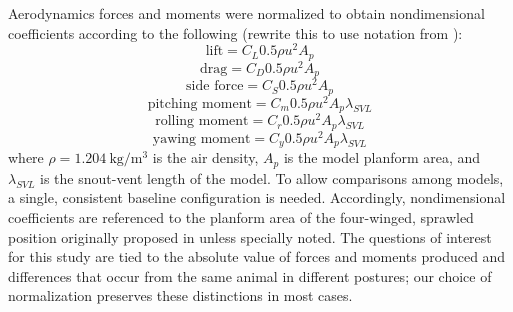 Aerodynamics forces and moments were  normalized to obtain nondimensional coefficients according to the following (rewrite this to use notation from \citep{McCormick:1995}): 
\begin{equation}
\mbox{lift} = C_L 0.5 \rho u^2 A_p
\end{equation}
\begin{equation}
\mbox{drag} = C_D 0.5 \rho u^2 A_p
\end{equation}
\begin{equation}
\mbox{side force} = C_S 0.5 \rho u^2 A_p
\end{equation}
\begin{equation}
\mbox{pitching moment} = C_m 0.5 \rho u^2 A_p \lambda_{SVL}
\end{equation}
\begin{equation}
\mbox{rolling moment} = C_r 0.5 \rho u^2 A_p \lambda_{SVL}
\end{equation}
\begin{equation}
\mbox{yawing moment} = C_y 0.5 \rho u^2 A_p \lambda_{SVL}
\end{equation}
where $\rho=\SI{1.204}{\kilo\gram\per\meter\cubed}$ is the air density, $A_p$ is the model planform area, and $\lambda_{SVL}$ is the snout-vent length of the model.  To allow comparisons among models, a single, consistent baseline configuration is needed.  Accordingly, nondimensional coefficients are referenced to the planform area of the four-winged, sprawled position originally proposed in \citep{Xu:2003} unless specially noted.  The questions of interest for this study are tied to the absolute value of forces and moments produced and differences that occur from the same animal in different postures; our choice of normalization preserves these distinctions in most cases.  



